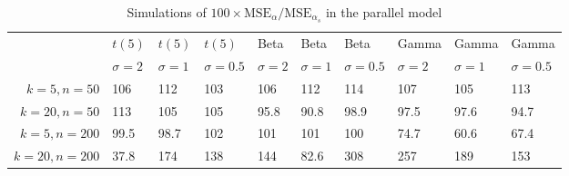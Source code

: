 \begin{table}[ht]
\centering
\caption{Simulations of $100 \times \textrm{MSE}_\alpha/\textrm{MSE}_{\alpha_s}$ in the parallel model} 
\label{tab:simulation}
\begin{tabular}{rlllllllll}
    & $t(5)$ & $t(5)$ & $t(5)$ & Beta & Beta & Beta & Gamma & Gamma & Gamma \\
  & $\sigma = 2$ & $\sigma = 1$ & $\sigma = 0.5$ & $\sigma = 2$ & $\sigma = 1$ & $\sigma = 0.5$ & $\sigma = 2$ & $\sigma = 1$ & $\sigma = 0.5$ \\
$k = 5, n = 50$ & 106 & 112 & 103 & 106 & 112 & 114 & 107 & 105 & 113 \\ 
  $k = 20, n = 50$ & 113 & 105 & 105 & 95.8 & 90.8 & 98.9 & 97.5 & 97.6 & 94.7 \\ 
  $k = 5, n = 200$ & 99.5 & 98.7 & 102 & 101 & 101 & 100 & 74.7 & 60.6 & 67.4 \\ 
  $k = 20, n = 200$ & 37.8 & 174 & 138 & 144 & 82.6 & 308 & 257 & 189 & 153 \\ 
  \end{tabular}
\end{table}
\newcommand{\geomean}{1.08}
